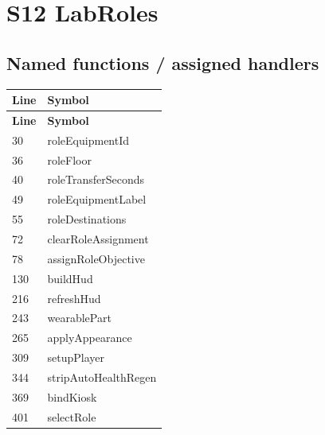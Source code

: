 \section{S12 LabRoles}
\subsection{Named functions /\allowbreak{} assigned handlers}
\begin{longtable}{p{}p{}}
\toprule
\textbf{Line} & \textbf{Symbol} \\ \midrule
\endfirsthead
\textbf{Line} & \textbf{Symbol} \\ \midrule
\endhead
30 & roleEquipmentId \\
36 & roleFloor \\
40 & roleTransferSeconds \\
49 & roleEquipmentLabel \\
55 & roleDestinations \\
72 & clearRoleAssignment \\
78 & assignRoleObjective \\
130 & buildHud \\
216 & refreshHud \\
243 & wearablePart \\
265 & applyAppearance \\
309 & setupPlayer \\
344 & stripAutoHealthRegen \\
369 & bindKiosk \\
401 & selectRole \\
\bottomrule
\end{longtable}
